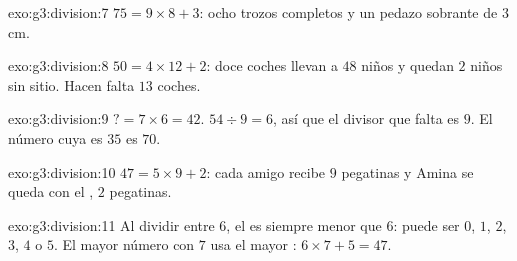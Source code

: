 \begin{solution}{exo:g3:division:7}
$75 = 9 \times 8 + 3$: ocho trozos completos y un pedazo sobrante de
$3$ cm.
\end{solution}

\begin{solution}{exo:g3:division:8}
$50 = 4 \times 12 + 2$: doce coches llevan a $48$ niños y quedan $2$
niños sin sitio. Hacen falta $13$ coches.
\end{solution}

\begin{solution}{exo:g3:division:9}
$? = 7 \times 6 = 42$. \quad
$54 \div 9 = 6$, así que el divisor que falta es $9$. \quad
El número cuya  es $35$ es $70$.
\end{solution}

\begin{solution}{exo:g3:division:10}
$47 = 5 \times 9 + 2$: cada amigo recibe $9$ pegatinas y Amina
se queda con el , $2$ pegatinas.
\end{solution}

\begin{solution}{exo:g3:division:11}
Al dividir entre $6$, el  es siempre menor que $6$: puede ser
$0$, $1$, $2$, $3$, $4$ o $5$. El mayor número con  $7$
usa el mayor : $6 \times 7 + 5 = 47$.
\end{solution}
